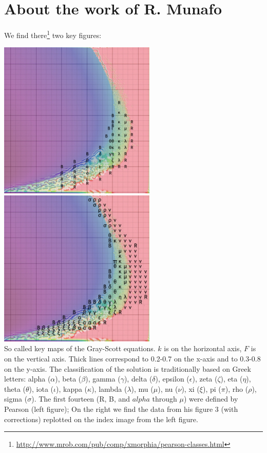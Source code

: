 \section*{About the work of R. Munafo}

We find there\footnote{\url{http://www.mrob.com/pub/comp/xmorphia/pearson-classes.html}}
two key figures:

\begin{center}
\includegraphics[height=7.5cm]{python_codes/fieldstone_171/images/pearson-orig}
\includegraphics[height=7.5cm]{python_codes/fieldstone_171/images/pearson-tags}\\
{\captionfont So called key maps of the Gray-Scott equations. $k$ is on the 
horizontal axis, $F$ is on the vertical axis. Thick lines correspond to 
0.2-0.7 on the x-axis and to 0.3-0.8 on the y-axis.
The classification of the solution is traditionally based on Greek letters:
alpha ($\alpha$),    beta ($\beta$),    gamma ($\gamma$),    delta ($\delta$),    
epsilon ($\epsilon$),    zeta ($\zeta$),    eta ($\eta$),    
theta ($\theta$),    iota ($\iota$),    kappa ($\kappa$),    lambda ($\lambda$),    
mu ($\mu$),    nu ($\nu$),    xi ($\xi$),    pi ($\pi$),    rho ($\rho$),    sigma ($\sigma$).
The first fourteen
(R, B, and $alpha$ through $\mu$) were defined by Pearson \cite{pear93} (left figure); 
On the right we find the data from his figure 3 (with corrections) replotted on the index image from the left figure. 
}
\end{center}

